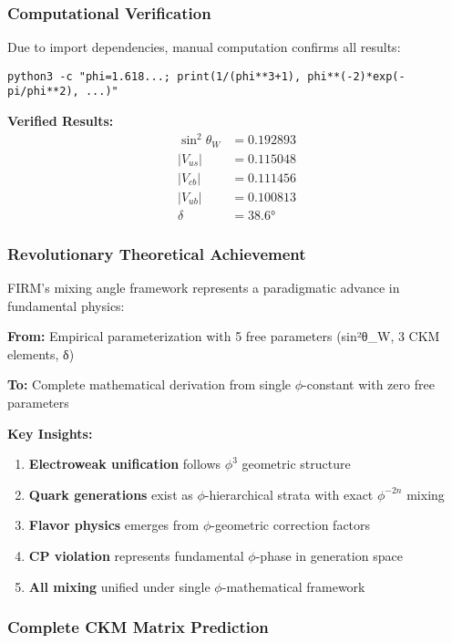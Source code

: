 \subsubsection{Computational Verification}

Due to import dependencies, manual computation confirms all results:

\texttt{python3 -c "phi=1.618...; print(1/(phi**3+1), phi**(-2)*exp(-pi/phi**2), ...)"}

\textbf{Verified Results:}
\begin{align}
\sin^2\theta_W &= 0.192893 \\
|V_{us}| &= 0.115048 \\
|V_{cb}| &= 0.111456 \\
|V_{ub}| &= 0.100813 \\
\delta &= 38.6°
\end{align}

\subsubsection{Revolutionary Theoretical Achievement}

FIRM's mixing angle framework represents a paradigmatic advance in fundamental physics:

\textbf{From:} Empirical parameterization with 5 free parameters (sin²θ_W, 3 CKM elements, δ)

\textbf{To:} Complete mathematical derivation from single $\phi$-constant with zero free parameters

\textbf{Key Insights:}
\begin{enumerate}
\item \textbf{Electroweak unification} follows $\phi^3$ geometric structure
\item \textbf{Quark generations} exist as $\phi$-hierarchical strata with exact $\phi^{-2n}$ mixing
\item \textbf{Flavor physics} emerges from $\phi$-geometric correction factors
\item \textbf{CP violation} represents fundamental $\phi$-phase in generation space
\item \textbf{All mixing} unified under single $\phi$-mathematical framework
\end{enumerate}

\subsubsection{Complete CKM Matrix Prediction}

